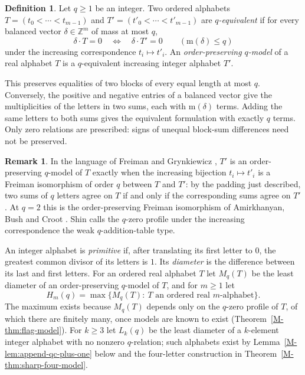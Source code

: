 \documentclass[11pt,reqno]{amsart}
\theoremstyle{plain}
\theoremstyle{definition}
\newtheorem{definition}[theorem]{Definition}
\newtheorem{remark}[theorem]{Remark}
\theoremstyle{plain}
\newcommand{\Z}{\mathbb{Z}}
\newcommand{\mass}{\mathrm{m}}
\theoremstyle{plain}
\theoremstyle{plain}
\theoremstyle{plain}
\theoremstyle{plain}
\theoremstyle{plain}
\theoremstyle{definition}
\theoremstyle{definition}
\theoremstyle{definition}
\theoremstyle{plain}
\begin{document}
\begin{definition}\label{M-def:model}
Let $q\ge1$ be an integer. Two ordered alphabets $T=(t_0<\cdots<t_{m-1})$ and
$T'=(t'_0<\cdots<t'_{m-1})$ are \emph{$q$-equivalent} if
for every balanced vector $\delta\in\Z^m$ of mass at most $q$,
\[
 \delta\cdot T=0\quad\Longleftrightarrow\quad\delta\cdot T'=0
 \qquad(\mass(\delta)\le q)
\]
under the increasing correspondence $t_i\mapsto t'_i$. An
\emph{order-preserving $q$-model} of a real alphabet $T$ is a $q$-equivalent
increasing integer alphabet $T'$.
\end{definition}

This preserves equalities of two blocks of every equal length at most $q$.
Conversely, the positive and negative entries of a balanced vector
give the multiplicities of the letters in two sums, each with
$\mass(\delta)$ terms. Adding the same letters to both sums gives
the equivalent formulation with exactly $q$ terms. Only zero relations are
prescribed: signs of unequal block-sum differences need not be preserved.

\begin{remark}\label{M-rem:freiman}
In the language of Freiman \cite{M-Fre73} and Grynkiewicz \cite{M-Gry13}, $T'$
is an order-preserving $q$-model of $T$ exactly when the increasing bijection
$t_i\mapsto t'_i$ is a Freiman isomorphism of order $q$ between $T$ and $T'$:
by the padding just described, two sums of $q$ letters agree on $T$ if and only
if the corresponding sums agree on $T'$. At $q=2$ this is the order-preserving
Freiman isomorphism of Amirkhanyan, Bush and Croot \cite{M-ABC18}. Shin
\cite{M-Shin26} calls the $q$-zero profile under the increasing correspondence
the weak $q$-addition-table type.
\end{remark}

An integer alphabet is \emph{primitive} if, after translating its first
letter to $0$, the greatest common divisor of its letters is $1$. Its
\emph{diameter} is the difference between its last and first letters. For an
ordered real alphabet $T$ let $M_q(T)$ be the least diameter of an
order-preserving $q$-model of $T$, and for $m\ge1$ let
\[
 H_m(q)=\max\{M_q(T):\ T\text{ an ordered real $m$-alphabet}\}.
\]
The maximum exists because $M_q(T)$ depends only on the $q$-zero profile of
$T$, of which there are finitely many, once models are known to exist
(Theorem~\ref{M-thm:flag-model}). For $k\ge3$ let $L_k(q)$ be the least
diameter of a $k$-element integer alphabet with no nonzero $q$-relation;
such alphabets exist by Lemma~\ref{M-lem:append-qc-plus-one} below and the
four-letter construction in Theorem~\ref{M-thm:sharp-four-model}.
\end{document}
